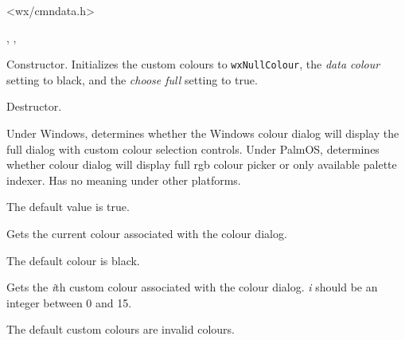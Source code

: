 
<wx/cmndata.h>


, , 



\label{wxcolourdatactor}


Constructor. Initializes the custom colours to {\tt wxNullColour},
the {\it data colour} setting
to black, and the {\it choose full} setting to true.


\label{wxcolourdatadtor}


Destructor.


\label{wxcolourdatagetchoosefull}


Under Windows, determines whether the Windows colour dialog will display the full dialog
with custom colour selection controls. Under PalmOS, determines whether colour dialog
will display full rgb colour picker or only available palette indexer.
Has no meaning under other platforms.

The default value is true.


\label{wxcolourdatagetcolour}


Gets the current colour associated with the colour dialog.

The default colour is black.


\label{wxcolourdatagetcustomcolour}


Gets the {\it i}th custom colour associated with the colour dialog. {\it i} should
be an integer between 0 and 15.

The default custom colours are invalid colours.


\label{wxcolourdatasetchoosefull}

